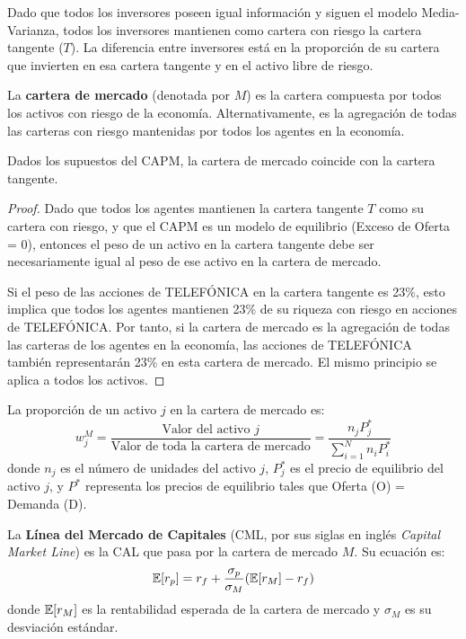 Dado que todos los inversores poseen igual información y siguen el modelo Media-Varianza, todos los inversores mantienen como cartera con riesgo la cartera tangente ($T$). La diferencia entre inversores está en la proporción de su cartera que invierten en esa cartera tangente y en el activo libre de riesgo.

\begin{definicion}
La \textbf{cartera de mercado} (denotada por $M$) es la cartera compuesta por todos los activos con riesgo de la economía. Alternativamente, es la agregación de todas las carteras con riesgo mantenidas por todos los agentes en la economía.
\end{definicion}

\begin{teorema}
Dados los supuestos del CAPM, la cartera de mercado coincide con la cartera tangente.
\end{teorema}

\begin{proof}
Dado que todos los agentes mantienen la cartera tangente $T$ como su cartera con riesgo, y que el CAPM es un modelo de equilibrio (Exceso de Oferta = 0), entonces el peso de un activo en la cartera tangente debe ser necesariamente igual al peso de ese activo en la cartera de mercado.

Si el peso de las acciones de TELEFÓNICA en la cartera tangente es 23\%, esto implica que todos los agentes mantienen 23\% de su riqueza con riesgo en acciones de TELEFÓNICA. Por tanto, si la cartera de mercado es la agregación de todas las carteras de los agentes en la economía, las acciones de TELEFÓNICA también representarán 23\% en esta cartera de mercado. El mismo principio se aplica a todos los activos.
\end{proof}

La proporción de un activo $j$ en la cartera de mercado es:
\begin{equation}
w_j^M = \frac{\text{Valor del activo } j}{\text{Valor de toda la cartera de mercado}} = \frac{n_j P_j^*}{\sum_{i=1}^{N} n_i P_i^*}
\end{equation}
donde $n_j$ es el número de unidades del activo $j$, $P_j^*$ es el precio de equilibrio del activo $j$, y $P^*$ representa los precios de equilibrio tales que Oferta (O) = Demanda (D).

\begin{definicion}
La \textbf{Línea del Mercado de Capitales} (CML, por sus siglas en inglés \textit{Capital Market Line}) es la CAL que pasa por la cartera de mercado $M$. Su ecuación es:
\begin{equation}
\mathbb{E}[r_p] = r_f + \frac{\sigma_p}{\sigma_M} (\mathbb{E}[r_M] - r_f)
\end{equation}
donde $\mathbb{E}[r_M]$ es la rentabilidad esperada de la cartera de mercado y $\sigma_M$ es su desviación estándar.
\end{definicion}

